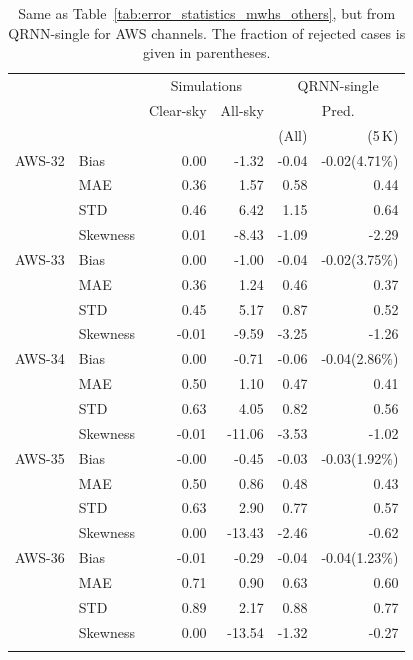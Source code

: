 \documentclass[amt, manuscript]{copernicus}
\begin{document}
\begin{table}[t]
	\caption{Same as Table~\ref{tab:error_statistics_mwhs_others}, but from QRNN-single for AWS channels. The fraction of rejected cases is given in parentheses. }
	\label{tab:statistics_qrnn_aws}
	\begin{tabular}{llrr|rr}
		\tophline
		&&\multicolumn{2}{c|}{Simulations}& \multicolumn{2}{c}{QRNN-single} \\
		\cline{3-6}
		&&Clear-sky &   All-sky &  \multicolumn{2}{c}{Pred.}  \\
		&&   &    &   (All) & (5\,K) \\
		\middlehline
		AWS-32  &Bias     & 0.00 & -1.32 & -0.04 & -0.02(4.71\%) \\
				&MAE      & 0.36 &  1.57 &  0.58 &  0.44 \\
				&STD      & 0.46 &  6.42 &  1.15 &  0.64 \\
				&Skewness & 0.01 & -8.43 & -1.09 & -2.29 \\
		\middlehline
		AWS-33	&Bias     &  0.00 & -1.00 & -0.04 & -0.02(3.75\%)  \\
				&MAE      &  0.36 &  1.24 &  0.46 &  0.37  \\
				&STD      &  0.45 &  5.17 &  0.87 &  0.52  \\
				&Skewness & -0.01 & -9.59 & -3.25 & -1.26  \\
		
		\middlehline
		AWS-34	&Bias    &  0.00 &  -0.71 & -0.06 & -0.04(2.86\%)  \\
				&MAE      &  0.50 &   1.10 &  0.47 &  0.41  \\
				&STD      &  0.63 &   4.05 &  0.82 &  0.56  \\
				&Skewness & -0.01 & -11.06 & -3.53 & -1.02  \\
		\middlehline
		AWS-35	&Bias    & -0.00 &  -0.45 & -0.03 & -0.03(1.92\%)  \\
				&MAE      &  0.50 &   0.86 &  0.48 &  0.43  \\
				&STD      &  0.63 &   2.90 &  0.77 &  0.57  \\
				&Skewness &  0.00 & -13.43 & -2.46 & -0.62  \\
		\middlehline
		AWS-36  &Bias    & -0.01 &  -0.29 & -0.04 & -0.04(1.23\%)  \\
				&MAE      &  0.71 &   0.90 &  0.63 &  0.60  \\
				&STD      &  0.89 &   2.17 &  0.88 &  0.77  \\
				&Skewness &  0.00 & -13.54 & -1.32 & -0.27  \\
		\bottomhline				
	\end{tabular}
	\belowtable{} %
\end{table}
\end{document}

